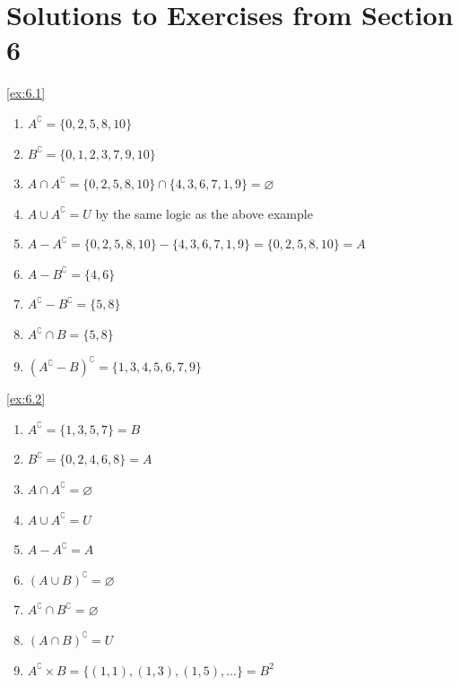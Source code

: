 
\section*{Solutions to Exercises from Section 6}

\begin{solution}\label{sol:6.1}\ref{ex:6.1}
    \begin{enumerate}
        \item $A^{\complement}=\{ 0,2,5,8,10 \}$
        \item $B^{\complement}=\{ 0,1,2,3,7,9,10 \}$
        \item $A\cap A^{\complement}=\{ 0,2,5,8,10 \}\cap \{ 4,3,6,7,1,9 \}=\varnothing$
        \item $A\cup A^{\complement}=U$ by the same logic as the above example
        \item $A-A^{\complement}=\{ 0,2,5,8,10 \}-\{ 4,3,6,7,1,9 \}=\{ 0,2,5,8,10 \}=A$
        \item $A-B^{\complement}=\{ 4,6 \}$
        \item $A^{\complement}-B^{\complement}=\{ 5,8 \}$
        \item $A^{\complement}\cap B=\{ 5,8 \}$
        \item ${(A^{\complement}-B)}^{\complement}=\{ 1,3,4,5,6,7,9 \}$
    \end{enumerate}
\end{solution}

\begin{solution}\label{sol:6.2}\ref{ex:6.2}
    \begin{enumerate}
        \item $A^{\complement}=\{ 1,3,5,7 \}=B$
        \item $B^{\complement}=\{ 0,2,4,6,8 \}=A$
        \item $A\cap A^{\complement}=\varnothing$
        \item $A\cup A^{\complement}=U$
        \item $A-A^{\complement}=A$
        \item ${(A\cup B)}^{\complement}=\varnothing$
        \item $A^\complement\cap B^{\complement}=\varnothing$
        \item ${(A\cap B)}^{\complement}=U$
        \item $A^{\complement}\times B=\{ (1,1),(1,3),(1,5),\dots \}=B^{2}$
    \end{enumerate}
\end{solution}

